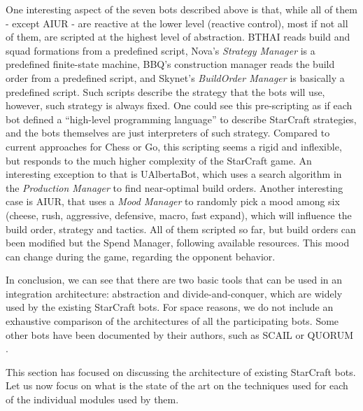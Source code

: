 \documentclass[journal]{IEEEtran}
\begin{document}
One  interesting aspect  of the  seven bots  described above  is that,
while all  of them  - except AIUR  - are  reactive at the  lower level
(reactive  control), most  if not  all of  them, are  scripted  at the
highest level  of abstraction. BTHAI reads build  and squad formations
from  a  predefined  script,   Nova's  {\em  Strategy  Manager}  is  a
predefined finite-state machine,  BBQ's construction manager reads the
build  order from a  predefined script,  and Skynet's  {\em BuildOrder
  Manager} is basically a predefined script. Such scripts describe the
strategy  that the  bots will  use, however,  such strategy  is always
fixed.   One could see  this pre-scripting  as if  each bot  defined a
``high-level programming language''  to describe StarCraft strategies,
and   the   bots   themselves    are   just   interpreters   of   such
strategy.  Compared  to  current  approaches  for Chess  or  Go,  this
scripting  seems a  rigid and  inflexible,  but responds  to the  much
higher complexity of the  StarCraft game.  An interesting exception to
that  is  UAlbertaBot, which  uses  a  search  algorithm in  the  {\em
  Production  Manager}  to find  near-optimal  build orders.   Another
interesting case is  AIUR, that uses a {\em  Mood Manager} to randomly
pick  a mood among  six (cheese,  rush, aggressive,  defensive, macro,
fast  expand), which  will  influence the  build  order, strategy  and
tactics.  All of  them  scripted so  far,  but build  orders can  been
modified but  the Spend Manager, following  available resources.  This
mood can change during the game, regarding the opponent behavior.

In conclusion, we can see that there are two basic tools that can be used in an integration architecture: abstraction and divide-and-conquer, which are widely used by the existing StarCraft bots. For space reasons, we do not include an exhaustive comparison of the architectures of all the participating bots. Some other bots have been documented by their authors, such as SCAIL \cite{YoungSCAIL} or QUORUM \cite{young2012evolutionary}.

This section has focused on discussing the architecture of existing StarCraft bots. Let us now focus on what is the state of the art on the techniques used for each of the individual modules used by them.

\end{document}
